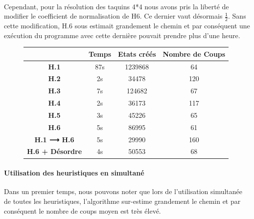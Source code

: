 \documentclass[10pt,a4paper]{report}
\begin{document}
\paragraph{}{Cependant, pour la résolution des taquins 4*4 nous avons pris la liberté de modifier le coefficient de normalisation de H6. Ce dernier vaut désormais $\mathsf{\tfrac{1}{2}}$. Sans cette modification, H.6 sous estimait grandement le chemin et par conséquent une exécution du programme avec cette dernière pouvait prendre plus d'une heure.}
{\scriptsize{}
\renewcommand{\arraystretch}{1.3}
\vspace*{.5cm}
\begin{figure}[h!]
\centering
\begin{tabular}{| c | c | c | c |} \hline
\textbf{ } & \textbf{Temps} & \textbf{Etats créés} & \textbf{Nombre de Coups}\\ \hline
\textbf{H.1} & 87s & 1239868 & 64 \\ \hline
\textbf{H.2} & 2s & 34478 & 120 \\ \hline
\textbf{H.3} & 7s & 124682 & 67 \\ \hline
\textbf{H.4} & 2s & 36173 & 117 \\ \hline
\textbf{H.5} & 3s & 45226 & 65\\ \hline
\textbf{H.6} & 5s & 86995 & 61 \\ \hline
\textbf{H.1 ⟶ H.6}&5s&29990&160\\ \hline
\textbf{H.6 + Désordre}&4s&50553&68\\ \hline
\end{tabular}
\end{figure}
}

\paragraph{Utilisation des heuristiques en simultané}{Dans un premier temps, nous pouvons noter que lors de l'utilisation simultanée de toutes les heuristiques, l'algorithme sur-estime grandement le chemin et par conséquent le nombre de coups moyen est très élevé.}
\end{document}
